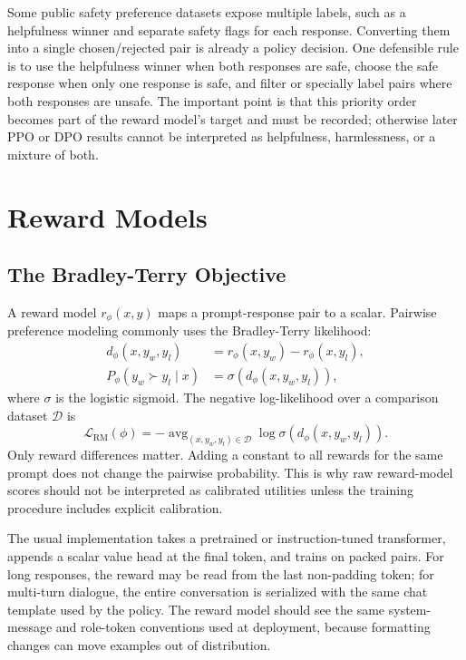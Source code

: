 Some public safety preference datasets expose multiple labels, such as a helpfulness winner and separate safety flags for each response. Converting them into a single chosen/rejected pair is already a policy decision. One defensible rule is to use the helpfulness winner when both responses are safe, choose the safe response when only one response is safe, and filter or specially label pairs where both responses are unsafe. The important point is that this priority order becomes part of the reward model's target and must be recorded; otherwise later PPO or DPO results cannot be interpreted as helpfulness, harmlessness, or a mixture of both.

\section{Reward Models}
\subsection{The Bradley-Terry Objective}
A reward model $r_\phi(x,y)$ maps a prompt-response pair to a scalar. Pairwise preference modeling commonly uses the Bradley-Terry likelihood:
\[
    \begin{aligned}
    d_\phi(x,y_w,y_l) &= r_\phi(x,y_w)-r_\phi(x,y_l),\\
    P_\phi(y_w \succ y_l \mid x) &= \sigma(d_\phi(x,y_w,y_l)),
    \end{aligned}
\]
where $\sigma$ is the logistic sigmoid. The negative log-likelihood over a comparison dataset $\mathcal{D}$ is
\[
    \mathcal{L}_{\mathrm{RM}}(\phi)
    =
    -\operatorname{avg}_{(x,y_w,y_l)\in\mathcal{D}}
    \log \sigma(d_\phi(x,y_w,y_l)).
\]
Only reward differences matter. Adding a constant to all rewards for the same prompt does not change the pairwise probability. This is why raw reward-model scores should not be interpreted as calibrated utilities unless the training procedure includes explicit calibration.

The usual implementation takes a pretrained or instruction-tuned transformer, appends a scalar value head at the final token, and trains on packed pairs. For long responses, the reward may be read from the last non-padding token; for multi-turn dialogue, the entire conversation is serialized with the same chat template used by the policy. The reward model should see the same system-message and role-token conventions used at deployment, because formatting changes can move examples out of distribution.

